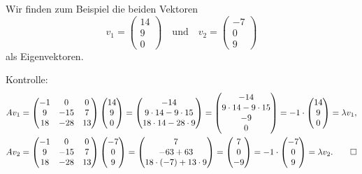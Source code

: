 \begin{loesung}
Wir finden zum Beispiel die beiden Vektoren
\[
v_1
=
\begin{pmatrix}14\\9\\0\end{pmatrix}
\quad\text{und}\quad
v_2
=
\begin{pmatrix}-7\\0\\9\end{pmatrix}
\]
als Eigenvektoren.

Kontrolle:
\begin{align*}
Av_1
&=
\begin{pmatrix}
-1&  0& 0\\
 9&-15& 7\\
18&-28&13
\end{pmatrix}
\begin{pmatrix}14\\9\\0\end{pmatrix}
=
\begin{pmatrix}
-14\\
9\cdot 14-9\cdot 15\\
18\cdot14-28\cdot 9
\end{pmatrix}
=
\begin{pmatrix}
-14\\
9\cdot 14-9\cdot 15\\
-9\\
0
\end{pmatrix}
=
-1\cdot
\begin{pmatrix}14\\9\\0\end{pmatrix}
=
\lambda v_1,
\\
Av_2
&=
\begin{pmatrix}
-1&  0& 0\\
 9&-15& 7\\
18&-28&13
\end{pmatrix}
\begin{pmatrix}-7\\0\\9\end{pmatrix}
=
\begin{pmatrix}
7\\
-63+63\\
18\cdot (-7) + 13\cdot 9
\end{pmatrix}
=
\begin{pmatrix}
7\\0\\-9
\end{pmatrix}
=
-1\cdot
\begin{pmatrix}-7\\0\\9\end{pmatrix}
=
\lambda v_2.
\qedhere
\end{align*}
\end{loesung}

